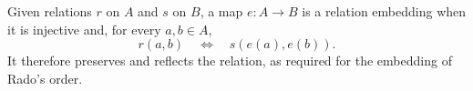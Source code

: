 \begin{definition}
Given relations $r$ on $A$ and $s$ on $B$, a map $e:A\to B$ is a relation
embedding when it is injective and, for every $a,b\in A$,
\[
r(a,b)\quad\Longleftrightarrow\quad s(e(a),e(b)).
\]
It therefore preserves and reflects the relation, as required for the
embedding of Rado's order.
\end{definition}
